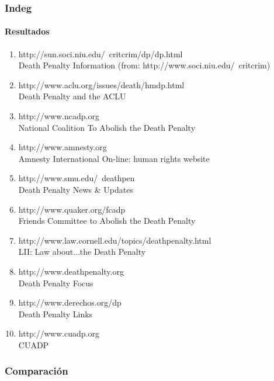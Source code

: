 \subsubsection{Indeg}

\paragraph{Resultados}
\begin{enumerate}
\item
http://sun.soci.niu.edu/~critcrim/dp/dp.html\\
Death Penalty Information (from: http://www.soci.niu.edu/~critcrim)\\
\item
http://www.aclu.org/issues/death/hmdp.html\\
Death Penalty and the ACLU\\
\item
http://www.ncadp.org\\
National Coalition To Abolish the Death Penalty\\
\item
http://www.amnesty.org\\
Amnesty International On-line: human rights website\\
\item
http://www.smu.edu/~deathpen\\
Death Penalty News \& Updates\\
\item
http://www.quaker.org/fcadp\\
Friends Committee to Abolish the Death Penalty\\
\item
http://www.law.cornell.edu/topics/deathpenalty.html\\
LII: Law about...the Death Penalty\\
\item
http://www.deathpenalty.org\\
Death Penalty Focus\\
\item
http://www.derechos.org/dp\\
Death Penalty Links\\
\item
http://www.cuadp.org\\
CUADP\\
\end{enumerate}

\subsubsection{Comparación}

